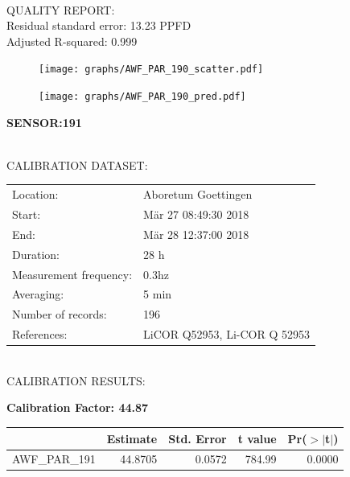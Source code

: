 \documentclass[oneside]{report}
\begin{document}
\hrulefill\\
QUALITY REPORT:\\
Residual standard error: 13.23 PPFD\\
Adjusted R-squared: 0.999



\begin{figure}[H]
  \centering
  \texttt{[image: graphs/AWF\_PAR\_190\_scatter.pdf]}
\end{figure}




\begin{figure}[H]
  \centering
  \texttt{[image: graphs/AWF\_PAR\_190\_pred.pdf]}
\end{figure}

\pagebreak


\begin{center}
\large{\textbf{SENSOR:191}}\\
\end{center}

\hrulefill\\
CALIBRATION DATASET:\\
\begin{table}[h!]
  \centering
  \label{tab:table1}
  \begin{tabular}{ll}
    Location: & Aboretum Goettingen\\ 
    
    
    Start:  & Mär 27 08:49:30 2018 \\
    End:   & Mär 28 12:37:00 2018\\ 
    Duration: & 28 h\\
    Measurement frequency: & 0.3hz\\
    Averaging:  &5 min\\
    Number of records: & 196 \\
    References: & LiCOR Q52953, Li-COR Q 52953 \\
  \end{tabular}
\end{table}

\hrulefill\\
CALIBRATION RESULTS:\\


\begin{center}
\textbf{\large{Calibration Factor: 44.87}}\\
\end{center}
\begin{table}[ht]
\centering
\begin{tabular}{rrrrr}
  \hline
 & Estimate & Std. Error & t value & Pr($>$$|$t$|$) \\ 
  \hline
AWF\_PAR\_191 & 44.8705 & 0.0572 & 784.99 & 0.0000 \\ 
   \hline
\end{tabular}
\end{table}
\end{document}
